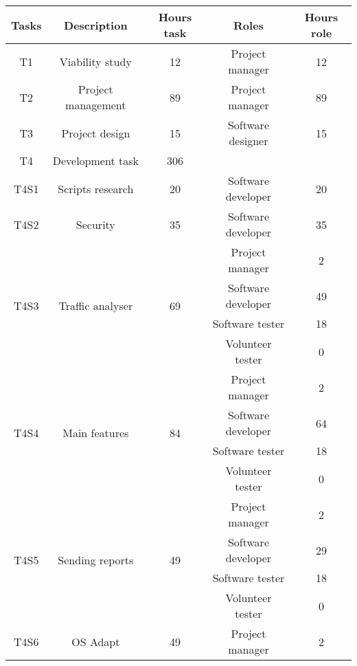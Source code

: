 \begin{table}[!htb]
\centering
  \begin{tabular}{| c | c | c | c | c |}
  \hline Tasks & Description & Hours task & Roles & Hours role \\ \hline \hline 
  T1 & Viability study & 12 & Project manager & 12 \\ \hline
  T2 & Project management & 89 &  Project manager & 89 \\ \hline
  T3 & Project design & 15 &  Software designer & 15  \\ \hline
  T4 & Development task & 306 &  &  \\ \hline \hline 
  \small{T4S1} & \small{Scripts research} & \small{20} & \small{Software developer} & \small{20}  \\ \hline
  \small{T4S2} & \small{Security} & \small{35} & \small{Software developer} & \small{35}  \\ \hline 
  \multirow{4}{*}{\small{T4S3}} & \multirow{4}{*}{\small{Traffic analyser}} & \multirow{4}{*}{\small{69}} & \small{Project manager} & \small{2} 
  \\ \cline{4-5} & & & \small{Software developer} & \small{49}  
  \\ \cline{4-5} & & & \small{Software tester} & \small{18}
  \\ \cline{4-5} & & & \small{Volunteer tester} & \small{0}
  \\ \hline 
  \multirow{4}{*}{\small{T4S4}} & \multirow{4}{*}{\small{Main features}} & \multirow{4}{*}{\small{84}} & \small{Project manager} & \small{2} 
  \\ \cline{4-5} & & & \small{Software developer} & \small{64}  
  \\ \cline{4-5} & & & \small{Software tester} & \small{18}
  \\ \cline{4-5} & & & \small{Volunteer tester} & \small{0}
  \\ \hline 
  \multirow{4}{*}{\small{T4S5}} & \multirow{4}{*}{\small{Sending reports}} & \multirow{4}{*}{\small{49}} & \small{Project manager} & \small{2} 
  \\ \cline{4-5} & & & \small{Software developer} & \small{29}  
  \\ \cline{4-5} & & & \small{Software tester} & \small{18}
  \\ \cline{4-5} & & & \small{Volunteer tester} & \small{0}
  \\ \hline 
  \multirow{4}{*}{\small{T4S6}} & \multirow{4}{*}{\small{OS Adapt}} & \multirow{4}{*}{\small{49}} & 
  \small{Project manager} & \small{2} 

\end{tabular}
\end{table}
